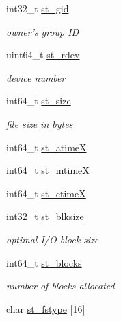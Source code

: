 \begin{DoxyCompactItemize}
int32\_\-t \hyperlink{structSolaris_1_1tgt__stat64_a520e7941817660848df8c562c9789145}{st\_\-gid}
\begin{DoxyCompactList}\small\item\em owner's group ID \item\end{DoxyCompactList}\item 
uint64\_\-t \hyperlink{structSolaris_1_1tgt__stat64_ac430407fd3b0e421da1ee8f66c95a786}{st\_\-rdev}
\begin{DoxyCompactList}\small\item\em device number \item\end{DoxyCompactList}\item 
int64\_\-t \hyperlink{structSolaris_1_1tgt__stat64_aec608d79c93ed6d010aec9f7487e0064}{st\_\-size}
\begin{DoxyCompactList}\small\item\em file size in bytes \item\end{DoxyCompactList}\item 
int64\_\-t \hyperlink{structSolaris_1_1tgt__stat64_aa19619629e025e0df8313d1ea279b50b}{st\_\-atimeX}
\item 
int64\_\-t \hyperlink{structSolaris_1_1tgt__stat64_a85f7ee07d7d01bcbae6a22cc45f01846}{st\_\-mtimeX}
\item 
int64\_\-t \hyperlink{structSolaris_1_1tgt__stat64_a30ae5d81c1593c9a028b0d57d39a6bb7}{st\_\-ctimeX}
\item 
int32\_\-t \hyperlink{structSolaris_1_1tgt__stat64_a10c65d9bc94bb57004da3be985b096a2}{st\_\-blksize}
\begin{DoxyCompactList}\small\item\em optimal I/O block size \item\end{DoxyCompactList}\item 
int64\_\-t \hyperlink{structSolaris_1_1tgt__stat64_a9817804f8469f6e886f9b29be9cf9d94}{st\_\-blocks}
\begin{DoxyCompactList}\small\item\em number of blocks allocated \item\end{DoxyCompactList}\item 
char \hyperlink{structSolaris_1_1tgt__stat64_a1619ec56c3d07bd0d9d35e1473653a63}{st\_\-fstype} \mbox{[}16\mbox{]}
\end{DoxyCompactItemize}



